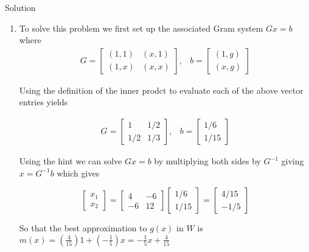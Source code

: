 \begin{center} Solution \end{center}

\begin{enumerate}

\item To solve this problem we first set up the associated Gram system $Gx = b$ where 
\[
\begin{array}{lr}
G = \left[ \begin{array}{cc} (1,1) & (x,1) \\ (1,x) & (x,x) \end{array} \right],
&
b = \left[ \begin{array}{c} (1,g) \\ (x,g) \end{array} \right]
\end{array}
\]

Using the definition of the inner prodct to evaluate each of the above vector entries yields

\[
\begin{array}{lr}
G = \left[ \begin{array}{cc} 1 & 1/2 \\ 1/2 & 1/3 \end{array} \right],
&
b = \left[ \begin{array}{c} 1/6 \\ 1/15 \end{array} \right]
\end{array}
\]

Using the hint we can solve $Gx = b$ by multiplying both sides by $G^{-1}$ giving $x = G^{-1}b$ which gives

\[
\left[ \begin{array}{c} x_1 \\ x_2 \end{array}\right] = 
\left[ \begin{array}{cc} 4 & -6 \\ -6 & 12 \end{array} \right]\left[ \begin{array}{c} 1/6 \\ 1/15 \end{array} \right] = \left[ \begin{array}{c} 4/15 \\ -1/5 \end{array} \right] 
\]

So that the best approximation to $g(x)$ in $W$ is $m(x) = \left(\frac{4}{15}\right) 1 + \left(-\frac{1}{5}\right)x = -\frac{1}{5}x + \frac{4}{15}$



\end{enumerate}
